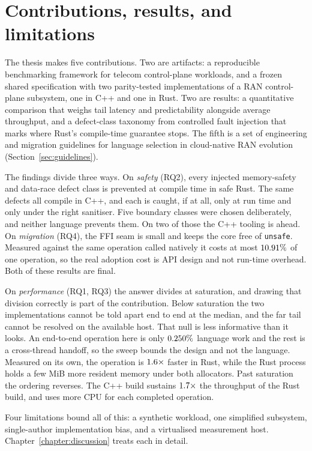 \documentclass[english,twoside,openright,a4paper,censored,csm,software-track-2020]{HYthesisML}
\begin{document}
\section{Contributions, results, and limitations}
The thesis makes five contributions. Two are artifacts: a reproducible benchmarking framework
for telecom control-plane workloads, and a frozen shared specification with two parity-tested
implementations of a RAN control-plane subsystem, one in C++ and one in Rust. Two are results:
a quantitative comparison that weighs tail latency and predictability alongside average
throughput, and a defect-class taxonomy from controlled fault injection that marks where Rust's
compile-time guarantee stops. The fifth is a set of engineering and migration guidelines for
language selection in cloud-native RAN evolution (Section~\ref{sec:guidelines}).

The findings divide three ways. On \emph{safety} (RQ2), every injected memory-safety and
data-race defect class is prevented at compile time in safe Rust. The same defects all compile
in C++, and each is caught, if at all, only at run time and only under the right sanitiser. Five
boundary classes were chosen deliberately, and neither language prevents them. On two of those
the C++ tooling is ahead. On \emph{migration} (RQ4), the FFI seam is small and keeps the core
free of \texttt{unsafe}. Measured against the same operation called natively it costs at most
$10.91\%$ of one operation, so the real adoption cost is API design and not run-time
overhead. Both of these results are final.

On \emph{performance} (RQ1, RQ3) the answer divides at saturation, and drawing that division
correctly is part of the contribution. Below saturation the two implementations cannot be told
apart end to end at the median, and the far tail cannot be resolved on the available host. That
null is less informative than it looks. An end-to-end operation here is only
$0.250\%$ language work and the rest is a cross-thread handoff, so the sweep bounds
the design and not the language. Measured on its own, the operation is
$1.6\times$ faster in Rust, while the Rust process holds a few MiB more resident
memory under both allocators. Past saturation the ordering reverses. The C++ build sustains
$1.7\times$ the throughput of the Rust build, and uses more CPU for each completed
operation.

Four limitations bound all of this: a synthetic workload, one simplified subsystem,
single-author implementation bias, and a virtualised measurement host.
Chapter~\ref{chapter:discussion} treats each in detail.
\end{document}
